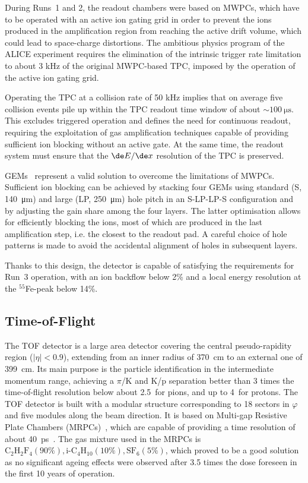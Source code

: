 During Runs~1 and 2, the readout chambers were based on MWPCs, which have to be operated with an active ion gating grid in order to prevent the ions produced in the amplification region from reaching the active drift volume, which could lead to space-charge distortions. The ambitious physics program of the ALICE experiment requires the elimination of the intrinsic trigger rate limitation to about 3 kHz of the original MWPC-based TPC, imposed by the operation of the active ion gating grid.

Operating the TPC at a collision rate of 50 kHz implies that on average five collision events pile up within the TPC readout time window of about $\sim\SI{100}{\micro\second}$. This excludes triggered operation and defines the need for continuous readout, requiring the exploitation of gas amplification techniques capable of providing sufficient ion blocking without an active gate. At the same time, the readout system must ensure that the $\de E/\de x$ resolution of the TPC is preserved.

GEMs~\cite{Sauli:1997qp} represent a valid solution to overcome the limitations of MWPCs. Sufficient ion blocking can be achieved by stacking four GEMs using standard (S, \SI{140}{\micro\meter}) and large (LP, \SI{250}{\micro\meter}) hole pitch in an S-LP-LP-S configuration and by adjusting the gain share among the four layers. The latter optimisation allows for efficiently blocking the ions, most of which are produced in the last amplification step, i.e. the closest to the readout pad. A careful choice of hole patterns is made to avoid the accidental alignment of holes in subsequent layers. 

Thanks to this design, the detector is capable of satisfying the requirements for Run~3 operation, with an ion backflow below 2\% and a local energy resolution at the $^{55}$Fe-peak below 14\%.

\subsection{Time-of-Flight}
The TOF detector is a large area detector covering the central pseudo-rapidity region ($\lvert\eta\rvert < 0.9$), extending from an inner radius of 370~cm to an external one of 399~cm. Its main purpose is the particle identification in the intermediate momentum range, achieving a $\pi$/K and K/p separation better than 3 times the time-of-flight resolution below about 2.5~\gevc for pions, and up to 4~\gevc for protons. The TOF detector is built with a modular structure corresponding to 18 sectors in $\varphi$ and five modules along the beam direction. It is based on Multi-gap Resistive Plate Chambers (MRPCs)~\cite{Wang:2020iwn}, which are capable of providing a time resolution of about 40~ps~\cite{ALICE:2008ngc}. The gas mixture used in the MRPCs is $\mathrm{C_2H_2F_4 (90\%), i\text{-}C_4H_{10} (10\%), SF_6 (5\%)}$, which proved to be a good solution as no significant ageing effects were observed after 3.5 times the dose foreseen in the first 10 years of operation.

